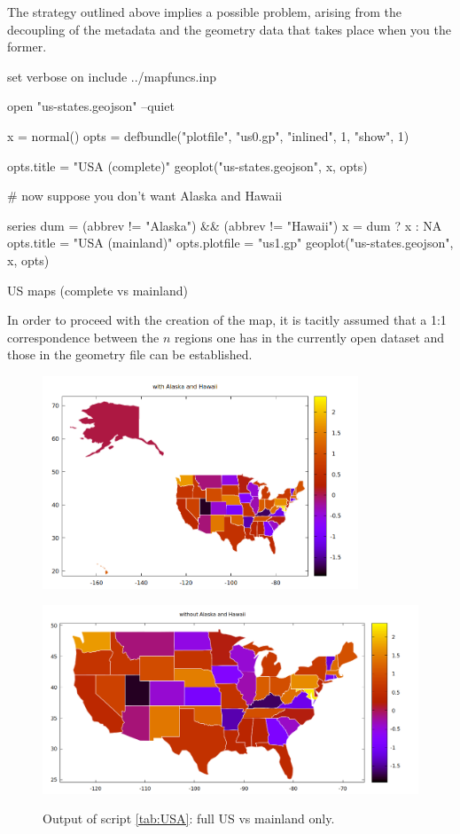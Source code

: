 \documentclass{article}
\begin{document}
The strategy outlined above implies a possible problem, arising from
the decoupling of the metadata and the geometry data that takes place
when you  the former.

\begin{table}[htbp]
  \begin{scode}
set verbose on
include ../mapfuncs.inp

open "us-states.geojson" --quiet

x = normal()
opts = defbundle("plotfile", "us0.gp", "inlined", 1, "show", 1)

opts.title = "USA (complete)"
geoplot("us-states.geojson", x, opts)

# now suppose you don't want Alaska and Hawaii

series dum = (abbrev != "Alaska") && (abbrev != "Hawaii")
x = dum ? x : NA
opts.title = "USA (mainland)"
opts.plotfile = "us1.gp"
geoplot("us-states.geojson", x, opts)
  \end{scode}
  \caption{US maps (complete vs mainland)}
  \label{tab:USA}
\end{table}

In order to proceed with the creation of the map, it is tacitly
assumed that a 1:1 correspondence between the $n$ regions one has in
the currently open dataset and those in the geometry file can be
established.

\begin{figure}[htbp]
  \begin{center}
  \includegraphics[height=180pt]{us0.png}

  \includegraphics[height=180pt]{us1.png}  
\end{center}
\caption{Output of script \ref{tab:USA}: full US vs mainland only.}
\label{fig:USA}
\end{figure}
\end{document}
